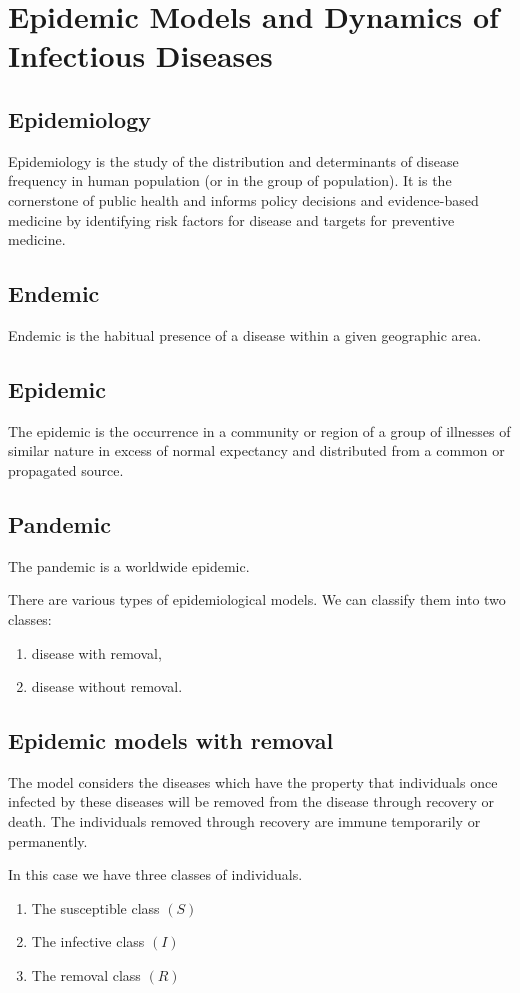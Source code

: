 \documentclass[../main-sheet.tex]{subfiles}
\begin{document}
\chapter{Epidemic Models and Dynamics of Infectious Diseases}
\section{Epidemiology}
Epidemiology is the study of the distribution and determinants of disease frequency in human population (or in the group of population). It is the cornerstone of public health and informs policy decisions and evidence-based medicine by identifying risk factors for disease and targets for preventive medicine.
\section{Endemic}
Endemic is the habitual presence of a disease within a given geographic area.
\section{Epidemic}
The epidemic is the occurrence in a community or region of a group of illnesses of similar nature in excess of normal expectancy and distributed from a common or propagated source.
\section{Pandemic}
The pandemic is a worldwide epidemic.

There are various types of epidemiological models. We can classify them into two classes:
\begin{enumerate}[label=(\roman*)]
    \item disease with removal,
    \item disease without removal.
\end{enumerate}
\section{Epidemic models with removal}
The model considers the diseases which have the property that individuals once infected by these diseases will be removed from the disease through recovery or death. The individuals removed through recovery are immune temporarily or permanently.

In this case we have three classes of individuals.
\begin{enumerate}[label=(\roman*)]
    \item The susceptible class \((S)\)
    \item The infective class \((I)\)
    \item The removal class \((R)\)
\end{enumerate}
\end{document}
